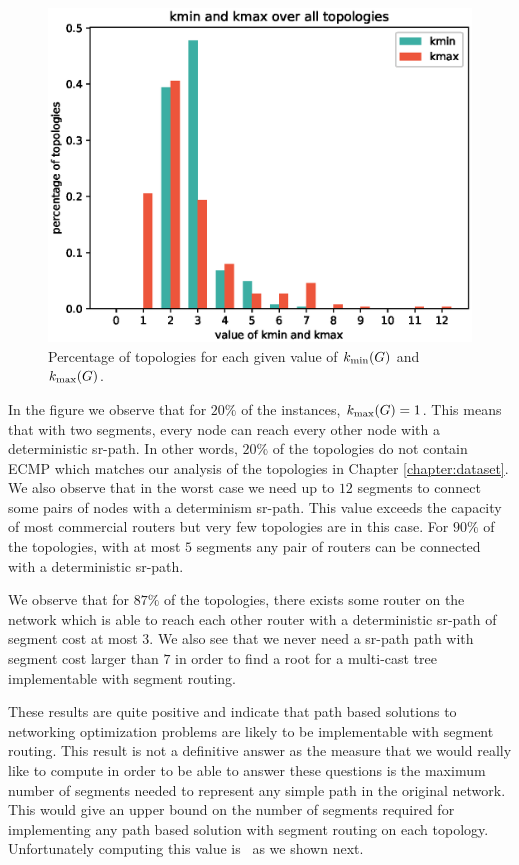 \begin{figure}
\begin{center}
\includegraphics[width=.85\columnwidth]{./Network-lib/data/plot/kminkmax.eps}
\end{center}
\caption{Percentage of topologies for each given value of $k_{\min}(G)$ and $k_{\max}(G)$.}
\label{fig:kminkmax}
\end{figure}

In the figure we observe that for $20\%$ of the instances, $k_{\max}(G) = 1$. This means that with two segments, every node
can reach every other node with a deterministic sr-path. In other words, $20\%$ of the topologies do not contain ECMP which matches our analysis
of the topologies in Chapter \ref{chapter:dataset}. We also observe that in the worst case we need up to $12$ segments
to connect some pairs of nodes with a determinism sr-path. This value exceeds the capacity of most commercial routers but very few topologies
are in this case. For $90\%$ of the topologies, with at most $5$ segments any pair of routers can be connected with a deterministic sr-path.

We observe that for $87\%$ of the topologies, there exists some router on the network which is able to reach each other router with a deterministic
sr-path of segment cost at most $3$. We also see that we never need a sr-path path with segment cost larger than $7$ in order to find a root for a multi-cast tree implementable with segment routing.

These results are quite positive and indicate that path based solutions to networking optimization problems are likely to be
implementable with segment routing. This result is not a definitive answer as the measure that we would really like to compute in order to be able to answer these
questions is the maximum number of segments needed to represent any simple path in the original network. This would give an
upper bound on the number of segments required for implementing any path based solution with segment routing on each topology. 
Unfortunately computing this value is \NPhard~as we shown next.

